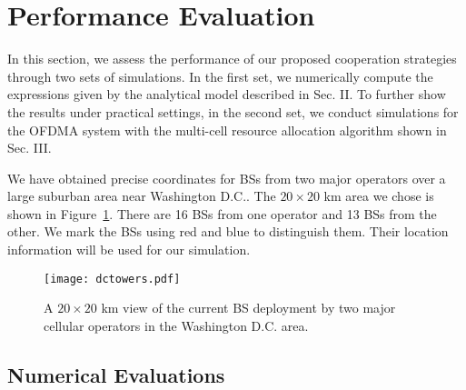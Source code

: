 \documentclass[conference]{IEEEtran}
\begin{document}
\section{Performance Evaluation}

In this section, we assess the performance of our proposed cooperation strategies through two sets of simulations. In the first set, we numerically compute the expressions given by the analytical model described in Sec. II. To further show the results under practical settings, in the second set, we conduct simulations for the OFDMA system with the multi-cell resource allocation algorithm shown in Sec. III.

We have obtained precise coordinates for BSs from two major operators over a large suburban area near Washington D.C.. The $20 \times 20$ km area we chose is shown in Figure~\ref{fig:dctowers}. There are 16 BSs from one operator and 13 BSs from the other. We mark the BSs using red and blue to distinguish them. Their location information will be used for our simulation.
\begin{figure}[htbp]
    \centerline{\texttt{[image: dctowers.pdf]}}
    \caption{
       A $20 \times 20$ km view of the current BS deployment by two major cellular operators in the Washington D.C. area.
    }
    \label{fig:dctowers}
\vspace{-0.3in}
\end{figure}

\subsection{Numerical Evaluations}
\end{document}
